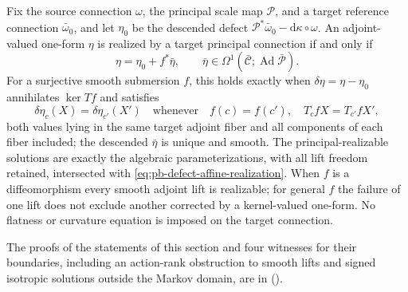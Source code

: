 Fix the source connection \(\omega\), the principal scale map \(\mathcal P\), and a target reference
connection \(\bar\omega_0\), and let \(\eta_0\) be the descended defect
\(\mathcal P^*\bar\omega_0-\mathrm d\kappa\circ\omega\). An adjoint-valued one-form \(\eta\) is realized
by a target principal connection if and only if
\begin{equation}
\eta=\eta_0+f^*\bar\eta,\qquad
\bar\eta\in\Omega^1(\bar{\mathcal C};\operatorname{Ad}\bar{\mathscr P}).
\label{eq:pb-defect-affine-realization}
\end{equation}
For a surjective smooth submersion \(f\), this holds exactly when \(\delta\eta=\eta-\eta_0\)
annihilates \(\ker Tf\) and satisfies
\begin{equation}
\delta\eta_c(X)=\delta\eta_{c'}(X')
\quad\text{whenever}\quad
f(c)=f(c'),\quad T_cfX=T_{c'}fX',
\label{eq:pb-defect-all-fiber-descent}
\end{equation}
both values lying in the same target adjoint fiber and all components of each fiber included; the
descended \(\bar\eta\) is unique and smooth. The principal-realizable solutions are exactly the
algebraic parameterizations, with all lift freedom retained, intersected with
\eqref{eq:pb-defect-affine-realization}. When \(f\) is a diffeomorphism every smooth adjoint lift is
realizable; for general \(f\) the failure of one lift does not exclude another corrected by a
kernel-valued one-form. No flatness or curvature equation is imposed on the target connection.

The proofs of the statements of this section and four witnesses for their boundaries, including an
action-rank obstruction to smooth lifts and signed isotropic solutions outside the Markov domain, are in
 ().
